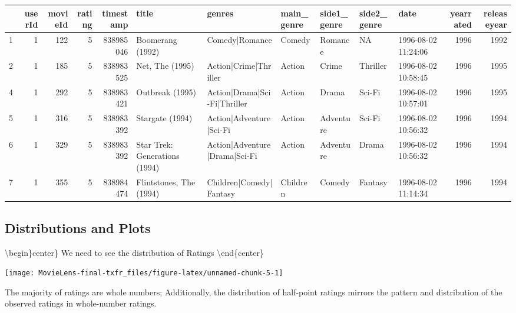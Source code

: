 \documentclass[
]{article}
\begin{document}
\begin{table}[!h]
\centering\begingroup\fontsize{4}{6}\selectfont

\begin{tabular}{l|r|r|r|r|l|l|l|l|l|l|r|r}
\hline
  & userId & movieId & rating & timestamp & title & genres & main\_genre & side1\_genre & side2\_genre & date & yearrated & releaseyear\\
\hline
1 & 1 & 122 & 5 & 838985046 & Boomerang (1992) & Comedy|Romance & Comedy & Romance & NA & 1996-08-02 11:24:06 & 1996 & 1992\\
\hline
2 & 1 & 185 & 5 & 838983525 & Net, The (1995) & Action|Crime|Thriller & Action & Crime & Thriller & 1996-08-02 10:58:45 & 1996 & 1995\\
\hline
4 & 1 & 292 & 5 & 838983421 & Outbreak (1995) & Action|Drama|Sci-Fi|Thriller & Action & Drama & Sci-Fi & 1996-08-02 10:57:01 & 1996 & 1995\\
\hline
5 & 1 & 316 & 5 & 838983392 & Stargate (1994) & Action|Adventure|Sci-Fi & Action & Adventure & Sci-Fi & 1996-08-02 10:56:32 & 1996 & 1994\\
\hline
6 & 1 & 329 & 5 & 838983392 & Star Trek: Generations (1994) & Action|Adventure|Drama|Sci-Fi & Action & Adventure & Drama & 1996-08-02 10:56:32 & 1996 & 1994\\
\hline
7 & 1 & 355 & 5 & 838984474 & Flintstones, The (1994) & Children|Comedy|Fantasy & Children & Comedy & Fantasy & 1996-08-02 11:14:34 & 1996 & 1994\\
\hline
\end{tabular}
\endgroup{}
\end{table}

\newpage

\hypertarget{distributions-and-plots}{%
\subsection{Distributions and Plots}\label{distributions-and-plots}}

\textbackslash begin\}center\} We need to see the distribution of
Ratings \textbackslash end\{center\}

\texttt{[image: MovieLens-final-txfr\_files/figure-latex/unnamed-chunk-5-1]}

The majority of ratings are whole numbers; Additionally, the
distribution of half-point ratings mirrors the pattern and distribution
of the observed ratings in whole-number ratings.

\newpage
\end{document}
